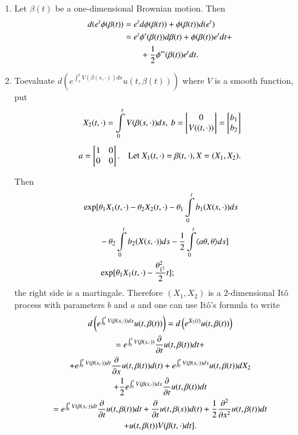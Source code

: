 \begin{examples*}
\begin{enumerate}
\item Let $\beta(t)$ be a one-dimensional Brownian motion. Then
\begin{align*}
d(e^{t}\phi(\beta(t)) &= e^{t}d\phi(\beta(t))+\phi(\beta(t))d(e^{t})\\
&= e^{t}\phi'(\beta(t))d\beta(t)+\phi(\beta(t))e^{t}dt+\\
&\qquad +\frac{1}{2}\phi''(\beta(t))e^{t}dt.
\end{align*}

\item To\pageoriginale evaluate
  $d(e^{\int^{t}_{e}V(\beta(s,\cdot))ds}u(t,\beta(t)))$ where $V$ is a
smooth function, put
\begin{align*}
X_{2}(t,\cdot)=\int\limits^{t}_{0}V(\beta(s,\cdot))ds,\ b=
\begin{bmatrix}
0\\
V((t,\cdot))
\end{bmatrix}
=
\begin{bmatrix}
b_{1}\\
b_{2}
\end{bmatrix}\\[4pt]
a=
\begin{bmatrix}
1 & 0\\
0 & 0
\end{bmatrix}.\quad\text{Let~ } X_{1}(t,\cdot)=\beta(t,\cdot),X=(X_{1},X_{2}).
\end{align*}

Then
{\fontsize{10pt}{12pt}\selectfont
\begin{align*}
& \exp
    [\theta_{1}X_{1}(t,\cdot)-\theta_{2}X_{2}(t,\cdot)-\theta_{1}\int\limits^{t}_{0}b_{1}(X(s,\cdot))ds\\
&\qquad
      -\theta_{2}\int\limits^{t}_{0}b_{2}(X(s,\cdot))ds-\frac{1}{2}\int\limits^{t}_{0}\langle
      a\theta,\theta\rangle ds]\\
&\qquad \exp [\theta_{1}X_{1}(t,\cdot)-\frac{\theta_{1^{2}}^{2}}{2}t];
\end{align*}}\relax
the right side is a martingale. Therefore $(X_{1},X_{2})$ is a
$2$-dimensio\-nal It\^o process with parameters $b$ and $a$ and one can
use It\^o's formula to write
\begin{gather*}
d\left(e^{\int^{t}_{0}V(\beta(s,\cdot))ds}u(t,\beta(t))\right)=d\left(e^{X_{2}(t)}u(t,\beta(t))\right)\\
=e^{\int^{t}_{0}V(\beta(s,\cdot))}\frac{\partial}{\partial t}u(t,\beta(t))dt+\\
+e^{\int^{t}_{0}V(\beta(s,\cdot))dt}\frac{\partial}{\partial
  x}u(t,\beta(t))d(t)+e^{\int^{t}_{0}V(\beta(s,\cdot))ds}u(t,\beta(t))dX_{2}\\
+\frac{1}{2}e^{\int^{t}_{0}V(\beta(s,\cdot))ds}\frac{\partial}{\partial
  t}u(t,\beta(t))dt\\
=e^{\int^{t}_{0}V(\beta(s,\cdot))dt}\frac{\partial}{\partial
  t}u(t,\beta(t))dt+\frac{\partial}{\partial
  t}u(t,\beta(s))d(t)+\frac{1}{2}\frac{\partial^{2}}{\partial
  x^{2}}u(t,\beta(t))dt\\
+u(t,\beta(t))V(\beta(t,\cdot)dt].
\end{gather*}


\end{enumerate}
\end{examples*}
